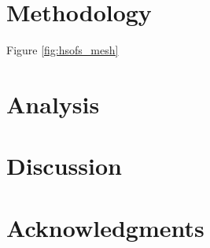 \documentclass[12pt,english]{article}
\begin{document}
\lipsum[5]

\section{Methodology}

Figure \ref{fig:hsofs_mesh} \lipsum[6-11]

\section{Analysis}

\lipsum[12-17]

\section{Discussion}

\lipsum[18-23]

\newpage{}

\section{Acknowledgments}

\lipsum[1] 


\end{document}
